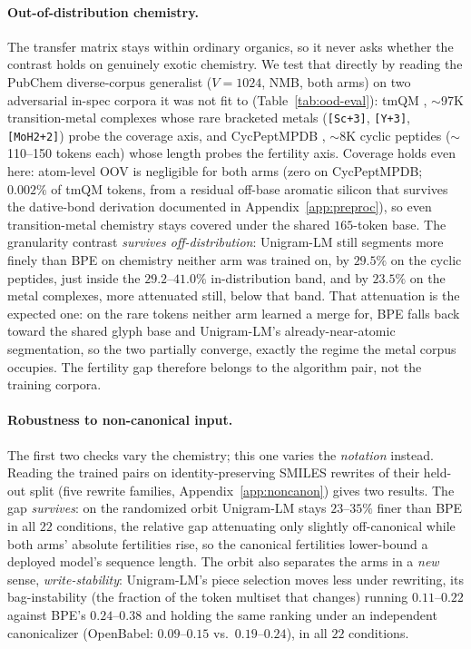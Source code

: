 \documentclass{article}
\begin{document}


\paragraph{Out-of-distribution chemistry.}
The transfer matrix stays within ordinary organics, so it never asks whether the
contrast holds on genuinely exotic chemistry. We test that directly by reading
the PubChem diverse-corpus generalist ($V{=}1024$, NMB, both arms) on two
adversarial in-spec corpora it was not fit to (Table~\ref{tab:ood-eval}):
tmQM \citep{balcells2020tmqm}, $\sim$97K transition-metal complexes whose rare
bracketed metals (\texttt{[Sc+3]}, \texttt{[Y+3]}, \texttt{[MoH2+2]}) probe the
coverage axis, and CycPeptMPDB \citep{li2023cycpeptmpdb}, $\sim$8K cyclic
peptides ($\sim$110--150 tokens each) whose length probes the fertility axis.
Coverage holds even here: atom-level OOV is negligible for both arms (zero on
CycPeptMPDB; $0.002\%$ of tmQM tokens, from a residual off-base aromatic silicon
that survives the dative-bond derivation documented in
Appendix~\ref{app:preproc}), so even transition-metal chemistry stays covered
under the shared $165$-token base. The granularity contrast \emph{survives
off-distribution}: Unigram-LM still segments more finely than BPE on chemistry
neither arm was trained on, by $29.5\%$ on the cyclic peptides, just inside
the $29.2$--$41.0\%$ in-distribution band, and by $23.5\%$ on the metal
complexes, more attenuated still, below that band. That attenuation is the expected one: on the rare
tokens neither arm learned a merge for, BPE falls back toward the shared
glyph base and Unigram-LM's already-near-atomic segmentation, so the two
partially converge, exactly the regime the metal corpus occupies. The fertility gap therefore belongs to the algorithm pair, not the training corpora.

\paragraph{Robustness to non-canonical input.}
The first two checks vary the chemistry; this one varies the \emph{notation}
instead. Reading the trained pairs on identity-preserving SMILES rewrites of their
held-out split (five rewrite families, Appendix~\ref{app:noncanon}) gives two
results. The gap \emph{survives}: on the randomized orbit Unigram-LM stays
$23$--$35\%$ finer than BPE in all $22$ conditions, the relative gap attenuating
only slightly off-canonical while both arms' absolute fertilities rise, so the
canonical fertilities lower-bound a deployed model's sequence length. The orbit also
separates the arms in a \emph{new} sense, \emph{write-stability}: Unigram-LM's
piece selection moves less under rewriting, its bag-instability (the fraction of
the token multiset that changes) running $0.11$--$0.22$ against BPE's
$0.24$--$0.38$ and holding the same ranking under an independent canonicalizer
(OpenBabel: $0.09$--$0.15$ vs.\ $0.19$--$0.24$), in all $22$ conditions.
\end{document}
